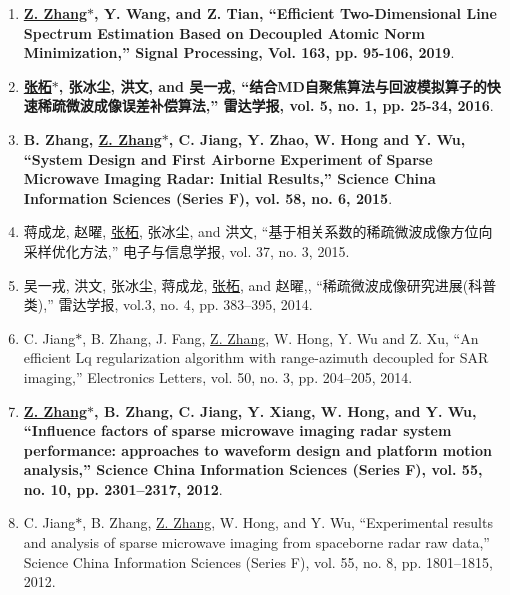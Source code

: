 \documentclass[paper=a4,fontsize=11pt]{scrartcl}
\begin{document}
\begin{enumerate}
\item \textbf{\underline{Z. Zhang$\ast$}, Y. Wang, and Z. Tian, ``Efficient Two-Dimensional Line Spectrum Estimation Based on Decoupled Atomic Norm Minimization,'' Signal Processing, Vol. 163, pp. 95-106, 2019}.



\item \textbf{\underline{张柘$\ast$}, 张冰尘, 洪文, and 吴一戎, ``结合MD自聚焦算法与回波模拟算子的快速稀疏微波成像误差补偿算法,'' 雷达学报, vol. 5, no. 1, pp. 25-34, 2016}.

\item \textbf{B. Zhang, \underline{Z. Zhang$\ast$}, C. Jiang, Y. Zhao, W. Hong and Y. Wu, ``System Design and First Airborne Experiment of Sparse Microwave Imaging Radar: Initial Results,'' Science China Information Sciences (Series F), vol. 58, no. 6, 2015}.

\item 蒋成龙, 赵曜, \underline{张柘}, 张冰尘, and 洪文, ``基于相关系数的稀疏微波成像方位向采样优化方法,'' 电子与信息学报, vol. 37, no. 3, 2015.

\item 吴一戎, 洪文, 张冰尘, 蒋成龙, \underline{张柘}, and 赵曜,, ``稀疏微波成像研究进展(科普类),'' 雷达学报, vol.3, no. 4, pp. 383--395, 2014.

\item C. Jiang$\ast$, B. Zhang, J. Fang, \underline{Z. Zhang}, W. Hong, Y. Wu and Z. Xu, ``An efficient Lq regularization algorithm with range-azimuth decoupled for SAR imaging,'' Electronics Letters, vol. 50, no. 3, pp. 204--205, 2014.

\item \textbf{\underline{Z. Zhang$\ast$}, B. Zhang, C. Jiang, Y. Xiang, W. Hong, and Y. Wu, ``Influence factors of sparse microwave imaging radar system performance: approaches to waveform design and platform motion analysis,'' Science China Information Sciences (Series F), vol. 55, no. 10, pp. 2301--2317, 2012}.

\item C. Jiang$\ast$, B. Zhang, \underline{Z. Zhang}, W. Hong, and Y. Wu, ``Experimental results and analysis of sparse microwave imaging from spaceborne radar raw data,'' Science China Information Sciences (Series F), vol. 55, no. 8, pp. 1801--1815, 2012.


\end{enumerate}
\end{document}
